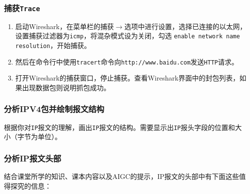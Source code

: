 \documentclass{article}
\begin{document}
\subsubsection{捕获\texttt{Trace}}

\begin{enumerate}[noitemsep]
	\item
	启动Wireshark，在菜单栏的捕获\(\to \)选项中进行设置，选择已连接的以太网，设置捕获过滤器为\texttt{icmp}，将混杂模式设为关闭，勾选 \texttt{enable network name resolution}，开始捕获。
	\item 然后在命令行中使用\texttt{tracert}命令向\texttt{http://www.baidu.com}发送\texttt{HTTP}请求。
	\item
	打开Wireshark的捕获窗口，停止捕获。查看Wireshark界面中的封包列表，如果出现数据包则说明抓包成功。
\end{enumerate}

\subsubsection{分析IPV4包并绘制报文结构}

根据你对\texttt{IP}报文的理解，画出\texttt{IP}报文的结构。需要显示出\texttt{IP}报头字段的位置和大小（字节为单位）。

\subsubsection{分析IP报文头部}

结合课堂所学的知识、课本内容以及AIGC的提示，IP报文的头部中有下面这些值得探究的信息：
\end{document}
